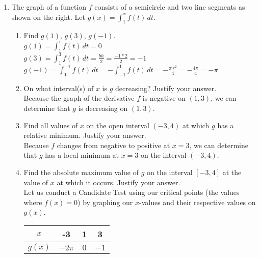 \documentclass[10pt, letterpaper]{report}
\begin{document}
\begin{enumerate}
\begin{enumerate}
  \end{enumerate}
\pagebreak
  \item{The graph of a function $f$ consists of a semicircle and two line segments as shown on the right. Let $g(x)=\int_{1}^{x}{f(t)}\,dt$.}
  \begin{enumerate}
    \item{Find $g(1)$, $g(3)$, $g(-1)$.} \\

      $g(1)=\int_{1}^{1}{f(t)}\,dt=0$ \\

      $g(3)=\int_{1}^{3}{f(t)}\,dt=\frac{bh}{2}=\frac{-1*2}{2}=-1$ \\

      $g(-1)=\int_{1}^{-1}{f(t)}\,dt=-\int_{-1}^{1}{f(t)}\,dt=-\frac{\pi\,r^{2}}{4}=
      -\frac{4\pi}{4}=-\pi$ \\

    \item{On what interval(s) of $x$ is $g$ decreasing? Justify your answer.} \\

      Because the graph of the derivative $f$ is negative on $(1,3)$, we can determine that $g$ is decreasing on $(1,3)$. \\

    \item{Find all values of $x$ on the open interval $(-3, 4)$ at which $g$ has a relative minimum. Justify your answer.} \\

      Because $f$ changes from negative to positive at $x=3$, we can determine that $g$ has a local minimum at $x=3$ on the interval $(-3,4)$. \\

    \item{Find the absolute maximum value of $g$ on the interval $[-3,4]$ at the value of $x$ at which it occurs. Justify your answer.} \\

      Let us conduct a Candidate Test using our critical points (the values where $f(x)=0$) by graphing our $x$-values and their respective values on $g(x)$.

      \begin{center}
        \begin{tabular}{| c | c | c | c |}
          \hline
          $x$ & -3 & 1 & 3 \\
          \hline
          $g(x)$ & $-2\pi$ & $0$ & $-1$ \\
          \hline
        \end{tabular}
      \end{center}


\end{enumerate}
\end{enumerate}
\end{document}

